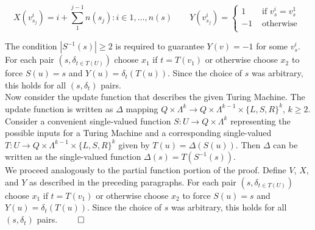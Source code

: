 \documentclass[11pt]{article}
\let\emptyset\varnothing
\begin{document}
\begin{equation*}
X(v_{s_{j}}^i) = i + \sum_{1}^{j - 1}{n({s_{j}})} : i \in 1, \dots, n(s) \quad \quad 
Y(v_{s_{j}}^i) = \begin{cases}
       1 & \text{ if } v_{s}^i = v_{s}^1 \\
       -1 & \text{ otherwise } \\
       \end{cases} 
\end{equation*}

\bigskip
The condition $ |S^{-1}(s)| \geq 2 $ is required to guarantee $ Y(v) = -1 $ for some $ v_{s}^i $. For each pair $ (s, \delta_{t \in T(U)} ) $ choose $ x_1 $ if $ t = T(v_1) $ or otherwise choose $ x_2 $ to force $ S(u) = s $ and $ Y(u) = \delta_{t}(T(u)) $. Since the choice of $ s $ was arbitrary, this holds for all $ (s, \delta_t) $ pairs. \\

Now consider the update function that describes the given Turing Machine. The update function is written as $ \Delta $ mapping $ Q \times \Lambda^{k} \rightarrow Q \times \Lambda^{k - 1} \times \{ L, S, R \} ^{k} $, $ k \geq 2 $. Consider a convenient single-valued function $ S: U \rightarrow Q \times \Lambda^{k} $ representing the possible inputs for a Turing Machine and a corresponding single-valued $ T: U \rightarrow Q \times \Lambda^{k - 1} \times \{ L, S, R \}^ {k} $ given by $ T(u) = \Delta(S(u)) $. Then $ \Delta $ can be written as the single-valued function $ \Delta(s) = T(S^{-1}(s)). $ \\

We proceed analogously to the partial function portion of the proof. Define $ V $, $ X $, and $ Y $ as described in the preceding paragraphs. For each pair $ (s, \delta_{t \in T(U)} ) $ choose $ x_1 $ if $ t = T(v_1) $ or otherwise choose $ x_2 $ to force $ S(u) = s $ and $ Y(u) = \delta_{t}(T(u)) $. Since the choice of $ s $ was arbitrary, this holds for all $ (s, \delta_t) $ pairs. $ \hfill \qed $ \\

\end{document}
